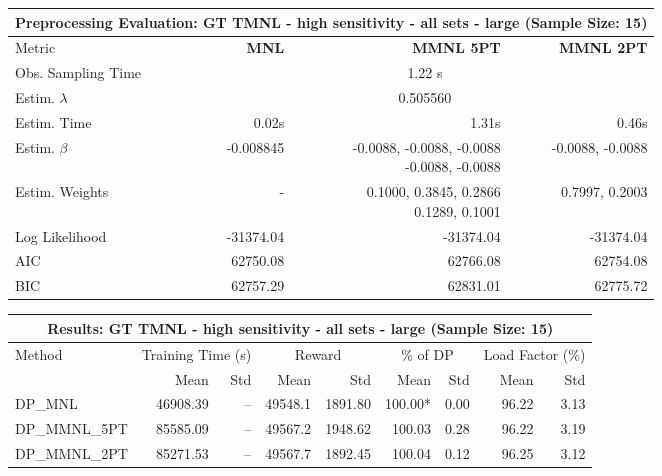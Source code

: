 
\begin{samepage}
\begin{center}
  \small
  \begin{tabular}{l|r|r|r}
    \toprule
    \multicolumn{4}{c}{\textbf{Preprocessing Evaluation: GT TMNL - high sensitivity - all sets - large (Sample Size: 15)}} \\
    \midrule
    Metric & \textbf{MNL} & \textbf{MMNL 5PT} & \textbf{MMNL 2PT} \\
    \midrule
    Obs. Sampling Time & \multicolumn{3}{c}{1.22 s} \\
    Estim. $\lambda$ & \multicolumn{3}{c}{0.505560} \\
    Estim. Time & 0.02s & 1.31s & 0.46s \\
    Estim. $\beta$ & -0.008845 & \makecell[tr]{-0.0088, -0.0088, -0.0088 \\ -0.0088, -0.0088} & -0.0088, -0.0088 \\
    Estim. Weights & - & \makecell[tr]{0.1000, 0.3845, 0.2866 \\ 0.1289, 0.1001} & 0.7997, 0.2003 \\
    Log Likelihood & -31374.04 & -31374.04 & -31374.04 \\
    AIC & 62750.08 & 62766.08 & 62754.08 \\
    BIC & 62757.29 & 62831.01 & 62775.72 \\
    \bottomrule
  \end{tabular}
\end{center}
\begin{center}
  \small
  \begin{tabular}{l|rr|rr|rr|rr}
    \toprule
    \multicolumn{9}{c}{\textbf{Results: GT TMNL - high sensitivity - all sets - large (Sample Size: 15)}} \\
    \midrule
    Method & \multicolumn{2}{c|}{Training Time (s)} & \multicolumn{2}{c|}{Reward} & \multicolumn{2}{c|}{\% of DP} & \multicolumn{2}{c}{Load Factor (\%)} \\
    & Mean & Std & Mean & Std & Mean & Std & Mean & Std \\
    \midrule
    DP\_MNL      & 46908.39 &    -- &    49548.1 &    1891.80 & 100.00* &    0.00 &   96.22 &    3.13 \\
    DP\_MMNL\_5PT & 85585.09 &    -- &    49567.2 &    1948.62 &  100.03 &    0.28 &   96.22 &    3.19 \\
    DP\_MMNL\_2PT & 85271.53 &    -- &    49567.7 &    1892.45 &  100.04 &    0.12 &   96.25 &    3.12 \\

\end{tabular}
\end{center}
\end{samepage}
